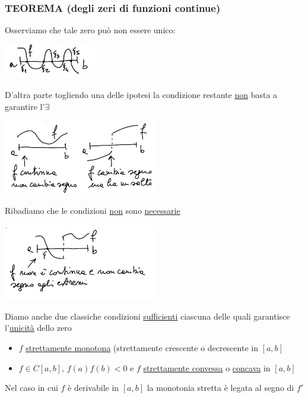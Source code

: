 \documentclass[12pt]{article}
\begin{document}
\subsubsection{TEOREMA (degli zeri di funzioni continue)}
\begin{center}
\end{center}
Osserviamo che tale zero può non essere unico:
\begin{center}
    \includegraphics[width=0.3\textwidth]{2.JPG}\par
\end{center}
D'altra parte togliendo una delle ipotesi la condizione restante \uline{non} basta a garantire l'$\exists$
\begin{center}
    \includegraphics[width=0.5\textwidth]{3.JPG}\par
\end{center}
Ribadiamo che le condizioni \uline{non} sono \uline{necessarie}
\begin{center}
    \includegraphics[width=0.5\textwidth]{4.JPG}\par
\end{center}
Diamo anche due classiche condizioni \uline{sufficienti} ciascuna delle quali garantisce l'\uline{unicità} dello zero
\begin{itemize}
    \item $f$ \uline{strettamente monotona} (strettamente crescente o decrescente in $[a,b]$
    \item $f \in C[a,b]$, $f(a)f(b)<0$ e $f$ \uline{strettamente convessa} o \uline{concava} in $[a,b]$
\end{itemize}
Nel caso in cui $f$ è derivabile in $[a,b]$ la monotonia stretta è legata al segno di $f'$
\end{document}
